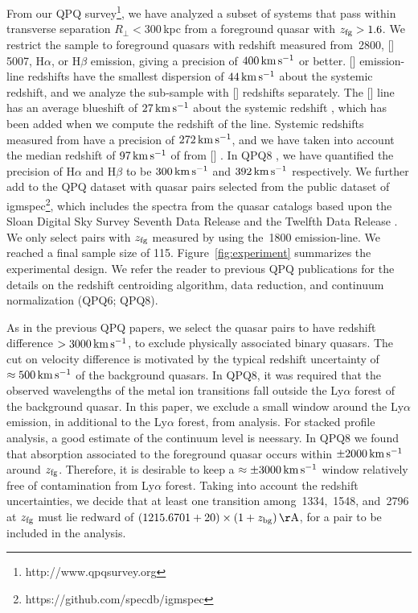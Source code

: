 \documentclass[iop]{emulateapj}
\begin{document}
From our QPQ survey\footnote{http://www.qpqsurvey.org}, we have analyzed a subset of systems that 
pass within transverse separation $R_\perp<300$\,kpc from a foreground quasar with 
$z_{\rm fg} > 1.6$. We restrict the sample to foreground quasars with redshift measured from 
\,2800, []\,5007, H$\alpha$, or H$\beta$ emission, giving a precision of 
$400\,{\rm km\,s^{-1}}$ or better. 
[] emission-line redshifts have the smallest dispersion of $44\,{\rm km\,s^{-1}}$ about 
the systemic redshift, and we analyze the sub-sample with [] redshifts separately. 
The [] line has an average blueshift of $27\,{\rm km\,s^{-1}}$ about the systemic 
redshift \citep{Boroson05}, which has been added when we compute the 
redshift of the line. Systemic redshifts measured from  have a precision of 
$272\,{\rm km\,s^{-1}}$, and we have taken into account the median redshift of 
$97\,{\rm km\,s^{-1}}$ of  from [] \citep{Richards+02}. In QPQ8 
\citep{QPQ8}, we have quantified the precision of H$\alpha$ and H$\beta$ to be 
$300\,{\rm km\,s^{-1}}$ and $392\,{\rm km\,s^{-1}}$ respectively. We further add to the QPQ 
dataset with quasar pairs selected from the public dataset of 
igmspec\footnote{https://github.com/specdb/igmspec}, which includes the spectra from the quasar 
catalogs based upon the Sloan Digital Sky Survey Seventh Data Release \citep{Schneider+10} and the 
Twelfth Data Release \citep{Paris+17}. We 
only select pairs with $z_{\rm fg}$ measured by \cite{HewettWild10} using the \,1800 
emission-line. We reached a final sample size of 115. Figure~\ref{fig:experiment} summarizes the 
experimental design. We refer the reader to previous QPQ publications for the details on the 
redshift centroiding algorithm, data reduction, and continuum normalization (QPQ6; QPQ8). 

As in the previous QPQ papers, we select the quasar pairs to have redshift difference 
$>3000\,{\rm km\,s^{-1}}$, to exclude physically associated binary quasars. The cut on velocity 
difference is motivated by the typical redshift uncertainty of $\approx500\,{\rm km\,s^{-1}}$ of 
the background quasars. In QPQ8, it was required that the observed wavelengths of the 
metal ion transitions fall outside the Ly$\alpha$ forest of the background quasar. In this paper, 
we exclude a small window around the Ly$\alpha$ emission, in additional to the Ly$\alpha$ forest, 
from analysis. For stacked profile analysis, a good estimate of 
the continuum level is neessary. In QPQ8 we found that absorption associated to 
the foreground quasar occurs within $\pm2000\,{\rm km\,s^{-1}}$ around $z_{\rm fg}$. Therefore, it 
is desirable to keep a $\approx\pm3000\,{\rm km\,s^{-1}}$ window relatively free of contamination 
from Ly$\alpha$ forest. Taking into account the redshift uncertainties, 
we decide that at least one transition among \,1334, \,1548, and 
\,2796 at $z_{\rm fg}$ must lie redward of 
$(1215.6701+20)\times(1+z_{\rm bg})\,{\rm \AA}$, for a pair to be included in the analysis. 
\end{document}

